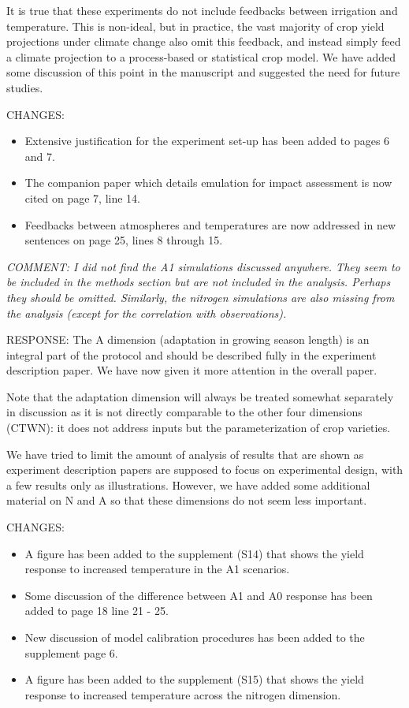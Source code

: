 \documentclass[gmd, manuscript]{copernicus} %
\begin{document}
It is true that these experiments do not include feedbacks between irrigation and temperature. This is non-ideal, but in practice, the vast majority of crop yield projections under climate change also omit this feedback, and instead simply feed a climate projection to a process-based or statistical crop model.  We have added some discussion of this point in the manuscript and suggested the need for future studies.
\smallskip

CHANGES: 
\begin{itemize}
    \item Extensive justification for the experiment set-up has been added to pages 6 and 7. 
    \item The companion paper which details emulation for impact assessment is now cited on page 7, line 14.
    \item Feedbacks between atmospheres and temperatures are now addressed in new sentences on page 25, lines 8 through 15.
\end{itemize}
\smallskip

\textcolor{dark-gray}{\textit{COMMENT: I did not find the A1 simulations discussed anywhere. They seem to be included in the methods section but are not included in the analysis. Perhaps they should be omitted. Similarly, the nitrogen simulations are also missing from the analysis (except for the correlation with observations).}}

RESPONSE: The A dimension (adaptation in growing season length) is an integral part of the protocol and should be described fully in the experiment description paper. We have now given it more attention in the overall paper.

Note that the adaptation dimension will always be treated somewhat separately in discussion as it is not directly comparable to the other four dimensions (CTWN):  it does not address inputs but the parameterization of crop varieties.

We have tried to limit the amount of analysis of results that are shown as experiment description papers are supposed to focus on experimental design, with a few results only as illustrations. However, we have added some additional material on N and A so that these dimensions do not seem less important.
\smallskip

CHANGES:
\begin{itemize}
    \item A figure has been added to the supplement (S14) that shows the yield response to increased temperature in the A1 scenarios. 
    \item Some discussion of the difference between A1 and A0 response has been added to page 18 line 21 - 25.
    \item New discussion of model calibration procedures has been added to the supplement page 6.
    \item A figure has been added to the supplement (S15) that shows the yield response to increased temperature across the nitrogen dimension.
\end{itemize}
\end{document}
